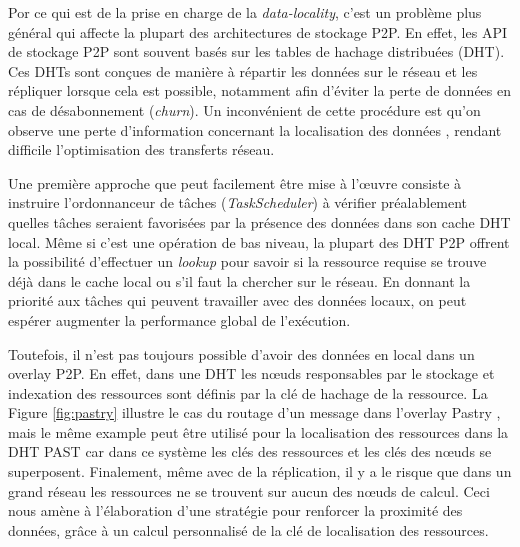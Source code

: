 Por ce qui est de la prise en charge de la \textit{data-locality}, c'est un problème plus général qui affecte la plupart des architectures de stockage P2P. En effet, les API de stockage P2P sont souvent basés sur les tables de hachage distribuées (DHT). Ces DHTs sont conçues de manière à répartir les données sur le réseau et les répliquer lorsque cela est possible, notamment afin d'éviter la perte de données en cas de désabonnement (\textit{churn}). Un inconvénient de cette procédure est qu'on observe une perte d'information concernant la localisation des données \cite{Wu2005}, rendant difficile l'optimisation des transferts réseau. 

Une première approche que peut facilement être mise à l'{\oe}uvre consiste à instruire l'ordonnanceur de tâches (\textit{TaskScheduler}) à vérifier préalablement quelles tâches seraient favorisées par la présence des données dans son cache DHT local. Même si c'est une opération de bas niveau, la plupart des DHT P2P offrent la possibilité d'effectuer un \textit{lookup} pour savoir si la ressource requise se trouve déjà dans le cache local ou s'il faut la chercher sur le réseau. En donnant la priorité aux tâches qui peuvent travailler avec des données locaux, on peut espérer augmenter la performance global de l'exécution.

Toutefois, il n'est pas toujours possible d'avoir des données en local dans un overlay P2P. En effet, dans une DHT les n{\oe}uds responsables par le stockage et indexation des ressources sont définis par la clé de hachage de la ressource. La Figure \ref{fig:pastry} illustre le cas du routage d'un message dans l'overlay Pastry \cite{Pastry01, Castro2002}, mais le même example peut être utilisé pour la localisation des ressources dans la DHT PAST \cite{Rowstron2001b} car dans ce système les clés des ressources et les clés des n{\oe}uds se superposent. Finalement, même avec de la réplication, il y a le risque que dans un grand réseau les ressources ne se trouvent sur aucun des n{\oe}uds de calcul. Ceci nous amène à l'élaboration d'une stratégie pour renforcer la proximité des données, grâce à un calcul personnalisé de la clé de localisation des ressources. 


